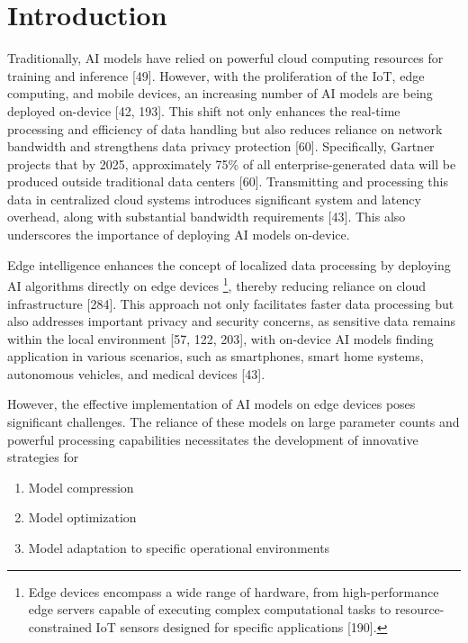 \section{Introduction}

Traditionally, AI models have relied on powerful cloud computing resources for training and inference [49]. However, with the proliferation of the IoT, edge computing, and mobile devices, an increasing number of AI models are being deployed on-device [42, 193]. This shift not only enhances the real-time processing and efficiency of data handling but also reduces reliance on network bandwidth and strengthens data privacy protection [60]. Specifically, Gartner projects that by 2025, approximately 75\% of all enterprise-generated data will be produced outside traditional data centers [60]. Transmitting and processing this data in centralized cloud systems introduces significant system and latency overhead, along with substantial bandwidth requirements [43]. This also underscores the importance of deploying AI models on-device.

Edge intelligence enhances the concept of localized data processing by deploying AI algorithms directly on edge devices \footnote{Edge devices encompass a wide range of hardware, from high-performance edge servers capable of executing complex computational tasks to resource-constrained IoT sensors designed for specific applications [190].}, thereby reducing reliance on cloud infrastructure [284]. This approach not only facilitates faster data processing but also addresses important privacy and security concerns, as sensitive data remains within the local environment [57, 122, 203], with on-device AI models finding application in various scenarios, such as smartphones, smart home systems, autonomous vehicles, and medical devices [43]. 

However, the effective implementation of AI models on edge devices poses significant challenges. The reliance of these models on large parameter counts and powerful processing capabilities necessitates the development of innovative strategies for
\begin{enumerate}
	\item Model compression 
	\item Model optimization
	\item Model adaptation to specific operational environments
\end{enumerate}




